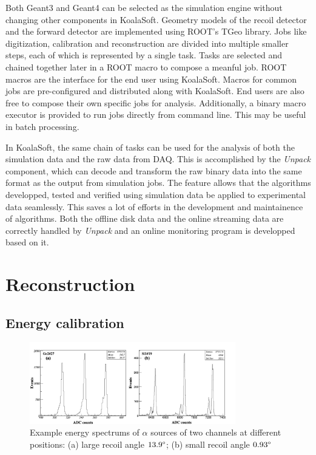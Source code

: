\documentclass[number,5p]{elsarticle}
\begin{document}
Both Geant3 and Geant4 can be selected as the simulation engine without changing other components in KoalaSoft.
Geometry models of the recoil detector and the forward detector are implemented using ROOT's TGeo library.
Jobs like digitization, calibration and reconstruction are divided into multiple smaller steps, each of which is represented by a single task.
Tasks are selected and chained together later in a ROOT macro to compose a meanful job. 
ROOT macros are the interface for the end user using KoalaSoft.
Macros for common jobs are pre-configured and distributed along with KoalaSoft.
End users are also free to compose their own specific jobs for analysis.
Additionally, a binary macro executor is provided to run jobs directly from command line. This may be useful in batch processing.

In KoalaSoft, the same chain of tasks can be used for the analysis of both the simulation data and the raw data from DAQ.
This is accomplished by the \emph{Unpack} component, which can decode and transform the raw binary data into the same format as the output from simulation jobs.
The feature allows that the algorithms developped, tested and verified using simulation data be applied to experimental data seamlessly.
This saves a lot of efforts in the development and maintainence of algorithms.
Both the offline disk data and the online streaming data are correctly handled by \emph{Unpack} and an online monitoring program is developped based on it.

\section{Reconstruction}
\label{sec:reconstruction}

\subsection{Energy calibration}
\label{sec:calibration}

\begin{figure}[htbp]
\centering
\includegraphics[width=0.8\textwidth]{./alpha_response.png}
\caption{Example energy spectrums of \(\alpha\) sources of two channels at different positions: (a) large recoil angle $13.9\degree$; (b) small recoil angle $0.93\degree$}
\label{fig:alpha_spectrum}
\end{figure}
\end{document}
